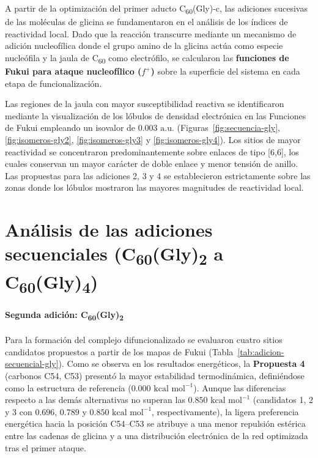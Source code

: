 A partir de la optimización del primer aducto C\textsubscript{60}(Gly)-c, las adiciones sucesivas de las moléculas de glicina se fundamentaron en el análisis de los índices de reactividad local. Dado que la reacción transcurre mediante un mecanismo de adición nucleofílica donde el grupo amino de la glicina actúa como especie nucleófila y la jaula de C\textsubscript{60} como electrófilo, se calcularon las \textbf{funciones de Fukui para ataque nucleofílico ($f^+$)} sobre la superficie del sistema en cada etapa de funcionalización.

Las regiones de la jaula con mayor susceptibilidad reactiva se identificaron mediante la visualización de los lóbulos de densidad electrónica en las Funciones de Fukui empleando un isovalor de $0.003\text{ a.u.}$ (Figuras~\ref{fig:secuencia-gly}, \ref{fig:isomeros-gly2}, \ref{fig:isomeros-gly3} y \ref{fig:isomeros-gly4}). Los sitios de mayor reactividad se concentraron predominantemente sobre enlaces de tipo [6,6], los cuales conservan un mayor carácter de doble enlace y menor tensión de anillo. Las propuestas para las adiciones 2, 3 y 4 se establecieron estrictamente sobre las zonas donde los lóbulos mostraron las mayores magnitudes de reactividad local.

\section{Análisis de las adiciones secuenciales (C\textsubscript{60}(Gly)\textsubscript{2} a C\textsubscript{60}(Gly)\textsubscript{4})}

\paragraph{Segunda adición: C\textsubscript{60}(Gly)\textsubscript{2}}
Para la formación del complejo difuncionalizado se evaluaron cuatro sitios candidatos propuestos a partir de los mapas de Fukui (Tabla~\ref{tab:adicion-secuencial-gly}). Como se observa en los resultados energéticos, la \textbf{Propuesta 4} (carbonos C54, C53) presentó la mayor estabilidad termodinámica, definiéndose como la estructura de referencia ($0.000\text{ kcal mol}^{-1}$). Aunque las diferencias respecto a las demás alternativas no superan las $0.850\text{ kcal mol}^{-1}$ (candidatos 1, 2 y 3 con $0.696$, $0.789$ y $0.850\text{ kcal mol}^{-1}$, respectivamente), la ligera preferencia energética hacia la posición C54--C53 se atribuye a una menor repulsión estérica entre las cadenas de glicina y a una distribución electrónica de la red optimizada tras el primer ataque.

